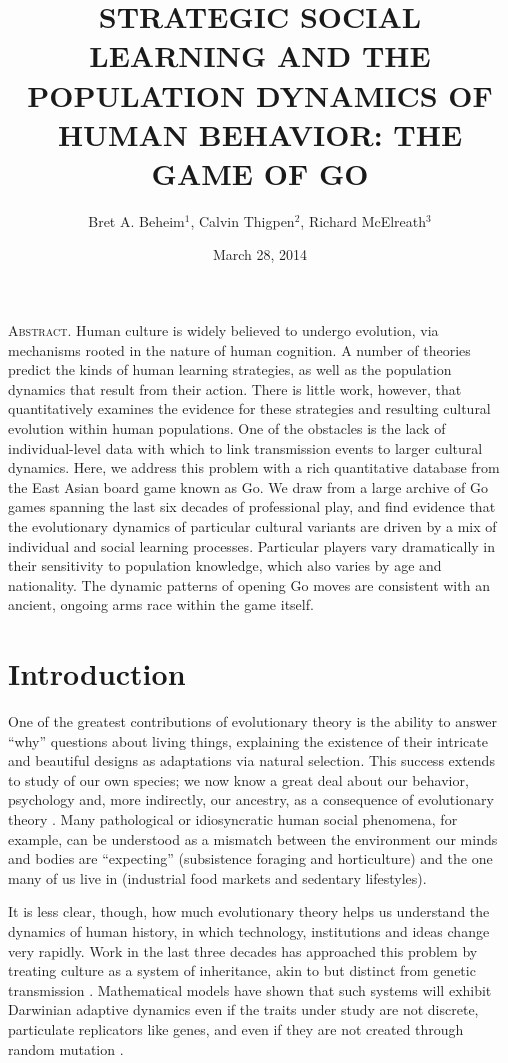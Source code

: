 \documentclass[reqno,12pt]{amsart}
\title[STRATEGIC SOCIAL LEARNING]
{\large STRATEGIC SOCIAL LEARNING AND THE POPULATION DYNAMICS OF HUMAN BEHAVIOR:
THE GAME OF GO}
\author{Bret A. Beheim\(^1\), Calvin Thigpen\(^2\), Richard McElreath\(^3\)}
\date{March 28, 2014}
\begin{document}
\maketitle

\noindent\textsc{Abstract.}
Human culture is widely believed to undergo evolution, via mechanisms rooted in the nature of human cognition. A number of theories predict the kinds of human learning strategies, as well as the population dynamics that result from their action. There is little work, however, that quantitatively examines the evidence for these strategies and resulting cultural evolution within human populations. One of the obstacles is the lack of individual-level data with which to link transmission events to larger cultural dynamics. Here, we address this problem with a rich quantitative database from the East Asian board game known as Go. We draw from a large archive of Go games spanning the last six decades of professional play, and find evidence that the evolutionary dynamics of particular cultural variants are driven by a mix of individual and social learning processes. Particular players vary dramatically in their sensitivity to population knowledge, which also varies by age and nationality. The dynamic patterns of opening Go moves are consistent with an ancient, ongoing arms race within the game itself.

\vspace{12pt}

\vspace{24pt}


\section{Introduction}

One of the greatest contributions of evolutionary theory is the ability to answer ``why'' questions about living things, explaining the existence of their intricate and beautiful designs as adaptations via natural selection. This success extends to study of our own species; we now know a great deal about our behavior, psychology and, more indirectly, our ancestry, as a consequence of evolutionary theory \citep{barkow1992adaptedmind, laland2002sense}. Many pathological or idiosyncratic human social phenomena, for example, can be understood as a mismatch between the environment our minds and bodies are ``expecting'' (subsistence foraging and horticulture) and the one many of us live in (industrial food markets and sedentary lifestyles).

It is less clear, though, how much evolutionary theory helps us understand the dynamics of human history, in which technology, institutions and ideas change very rapidly. Work in the last three decades has approached this problem by treating culture as a system of inheritance, akin to but distinct from genetic transmission \citep{durham1992coevolution, richerson2005genesalone}. Mathematical models have shown that such systems will exhibit Darwinian adaptive dynamics even if the traits under study are not discrete, particulate replicators like genes, and even if they are not created through random mutation \citep{boyd1985culture, henrich2002replicators}.
\end{document}
